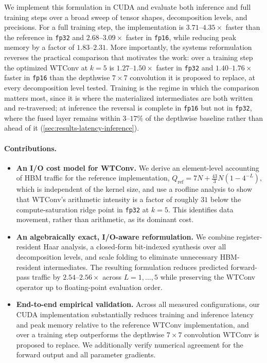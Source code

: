 \documentclass[10pt]{article} %
\newcommand{\Qio}{Q}                    %
\theoremstyle{plain}
\begin{document}
We implement this formulation in CUDA and evaluate both inference and full training steps over a broad sweep of tensor shapes, decomposition levels, and precisions. For a full training step, the implementation is $3.71$--$4.35\times$ faster than the reference in \texttt{fp32} and $2.68$--$3.09\times$ faster in \texttt{fp16}, while reducing peak memory by a factor of $1.83$--$2.31$. More importantly, the systems reformulation reverses the practical comparison that motivates the work: over a training step the optimized WTConv at $k{=}5$ is $1.27$--$1.50\times$ faster in \texttt{fp32} and $1.40$--$1.76\times$ faster in \texttt{fp16} than the depthwise $7\times7$ convolution it is proposed to replace, at every decomposition level tested. Training is the regime in which the comparison matters most, since it is where the materialized intermediates are both written and re-traversed; at inference the reversal is complete in \texttt{fp16} but not in \texttt{fp32}, where the fused layer remains within $3$--$17\%$ of the depthwise baseline rather than ahead of it (\autoref{sec:results-latency-inference}).

\paragraph{Contributions.}
\begin{itemize}\itemsep2pt

\item \textbf{An I/O cost model for WTConv.}
We derive an element-level accounting of HBM traffic for the reference implementation,
$
\Qio_{\mathrm{ref}}
=7N+\tfrac{43}{3}N(1-4^{-L}),
$
which is independent of the kernel size, and use a roofline analysis to show that WTConv's arithmetic intensity is a factor of roughly $31$ below the compute-saturation ridge point in \texttt{fp32} at $k{=}5$. This identifies data movement, rather than arithmetic, as its dominant cost.

\item \textbf{An algebraically exact, I/O-aware reformulation.}
We combine register-resident Haar analysis, a closed-form bit-indexed synthesis over all decomposition levels, and scale folding to eliminate unnecessary HBM-resident intermediates. The resulting formulation reduces predicted forward-pass traffic by $2.54$--$2.56\times$ across $L=1,\ldots,5$ while preserving the WTConv operator up to floating-point evaluation order.

\item \textbf{End-to-end empirical validation.}
Across all measured configurations, our CUDA implementation substantially reduces training and inference latency and peak memory relative to the reference WTConv implementation, and over a training step outperforms the depthwise $7\times7$ convolution WTConv is proposed to replace. We additionally verify numerical agreement for the forward output and all parameter gradients.

\end{itemize}
\end{document}
